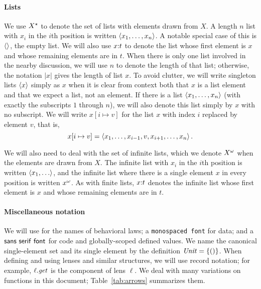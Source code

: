 \paragraph*{Lists}
We use $X^\star$ to denote the set of lists with elements drawn from $X$. A
length $n$ list with $x_i$ in the $i$th position is written $\left< x_1
,\ldots, x_n \right>$. A notable special case of this is $\left<\right>$, the empty
list. We will also use $x \mathord{:} t$ to denote the list whose first element
is $x$ and whose remaining elements are in $t$. When there is only one list
involved in the nearby discussion, we will use $n$ to denote the length of
that list; otherwise, the notation $|x|$ gives the length of list $x$. To
avoid clutter, we will write singleton lists $\left< x \right>$ simply as $x$
when it is clear from context both that $x$ is a list element and that we
expect a list, not an element. If there is a list $\left< x_1 ,\ldots, x_n
\right>$ (with exactly the subscripts $1$ through $n$), we will also denote
this list simply by $x$ with no subscript. We will write $x[i \mapsto v]$
for the list $x$ with index $i$ replaced by element $v$, that is,
\[x[i \mapsto v] = \left< x_1 ,\ldots, x_{i-1} , v , x_{i+1} ,\ldots,
x_n \right>.\]

We will also need to deal with the set of infinite lists, which we denote
$X^\omega$ when the elements are drawn from $X$. The infinite list with $x_i$
in the $i$th position is written $\left< x_1 ,\ldots\right>$, and the infinite list
where there is a single element $x$ in every position is written $x^\omega$.
As with finite lists, $x \mathord{:} t$ denotes the infinite list whose first
element is $x$ and whose remaining elements are in $t$.

\paragraph*{Miscellaneous notation}
We will use  for the names of behavioral laws; a
\texttt{monospaced font} for data; and a $\mathsf{sans\ serif\ font}$ for code
and globally-scoped defined values. We name the canonical single-element set
and its single element by the definition $\mathit{Unit}=\{{()}\}$. When defining
and using lenses and similar structures, we will use record notation; for
example, $\ell.\mathit{get}$ is the \GET component of lens $\ell$. We deal with
many variations on functions in this document; Table~\ref{tab:arrows}
summarizes them.

